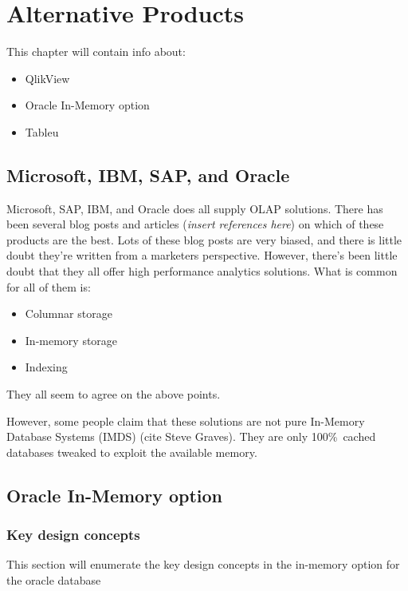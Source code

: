 \chapter{Alternative Products}
\label{chap:alternative-products}

This chapter will contain info about:

\begin{itemize}
  \item QlikView
  \item Oracle In-Memory option
  \item Tableu
\end{itemize}

\section{Microsoft, IBM, SAP, and Oracle}
Microsoft, SAP, IBM, and Oracle does all supply OLAP solutions. There has been several blog posts and articles (\textit{insert references here}) on which of these products are the best. Lots of these blog posts are very biased, and there is little doubt they're written from a marketers perspective. However, there's been little doubt that they all offer high performance analytics solutions. What is common for all of them is:
\begin{itemize}
  \item Columnar storage
  \item In-memory storage
  \item Indexing
\end{itemize}

They all seem to agree on the above points.

However, some people claim that these solutions are not pure In-Memory Database Systems (IMDS) (cite Steve Graves). They are only 100\%~cached databases tweaked to exploit the available memory.



\section{Oracle In-Memory option}
\label{sec:Oracle In-Memory option}

\subsection{Key design concepts}
\label{sub:Key design concepts}
This section will enumerate the key design concepts in the in-memory option for the oracle database


